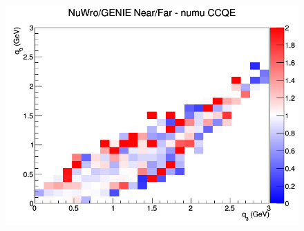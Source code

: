 \documentclass[12pt]{article}
\begin{document}
\begin{figure}[h]
\endminipage
{}
\includegraphics[width=\linewidth]{eff_q0_q3/LAr/ratios/CCQE_NuWro_GENIE_numu_NF_q3_q0.png}
\endminipage
\newline
\end{figure}
\clearpage
\end{document}
